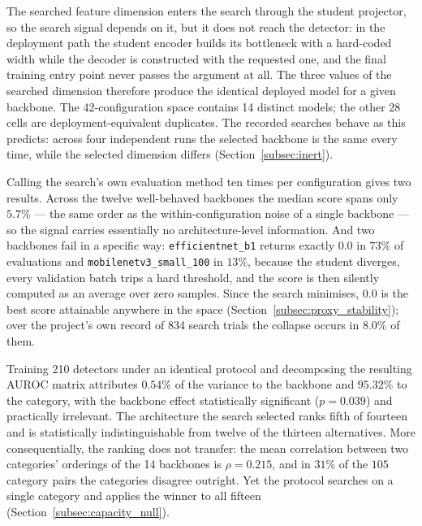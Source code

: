 The searched feature dimension enters the search through the student projector, so
the search signal depends on it, but it does not reach the detector: in the
deployment path the student encoder builds its bottleneck with a hard-coded width
while the decoder is constructed with the requested one, and the final training
entry point never passes the argument at all. The three values of the searched
dimension therefore produce the identical deployed model for a given backbone. The
42-configuration space contains 14 distinct models; the other 28 cells are
deployment-equivalent duplicates. The recorded searches behave as this predicts:
across four independent runs the selected backbone is the same every time, while
the selected dimension differs (Section~\ref{subsec:inert}).

 Calling the search's own evaluation method ten times per
configuration gives two results. Across the twelve well-behaved backbones the
median score spans only $5.7\%$ --- the same order as the within-configuration
noise of a single backbone --- so the signal carries essentially no
architecture-level information. And two backbones fail in a specific way:
\texttt{efficientnet\_b1} returns exactly $0.0$ in $73\%$ of evaluations and
\texttt{mobilenetv3\_small\_100} in $13\%$, because the student diverges, every
validation batch trips a hard threshold, and the score is then silently computed
as an average over zero samples. Since the search minimises, $0.0$ is the best
score attainable anywhere in the space
(Section~\ref{subsec:proxy_stability}); over the project's own record of 834
search trials the collapse occurs in $8.0\%$ of them.

Training 210 detectors under an identical protocol and decomposing the resulting
AUROC matrix attributes $0.54\%$ of the variance to the backbone and $95.32\%$ to
the category, with the backbone effect statistically significant ($p = 0.039$) and
practically irrelevant. The architecture the search selected ranks fifth of
fourteen and is statistically indistinguishable from twelve of the thirteen
alternatives. More consequentially, the ranking does not transfer: the mean
correlation between two categories' orderings of the 14 backbones is
$\rho = 0.215$, and in $31\%$ of the $105$ category pairs the categories disagree
outright. Yet the
protocol searches on a single category and applies the winner to all fifteen
(Section~\ref{subsec:capacity_null}).

